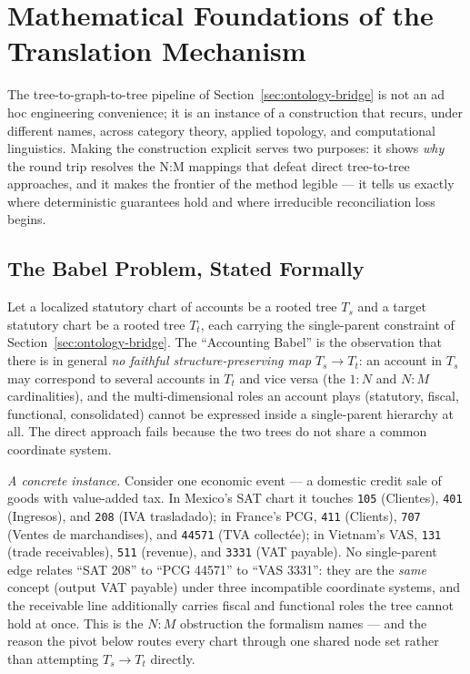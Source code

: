 \section{Mathematical Foundations of the Translation Mechanism}
\label{sec:mathfound}

The tree-to-graph-to-tree pipeline of Section~\ref{sec:ontology-bridge} is not an ad hoc
engineering convenience; it is an instance of a construction that recurs, under different
names, across category theory, applied topology, and computational linguistics. Making the
construction explicit serves two purposes: it shows \emph{why} the round trip resolves the
N:M mappings that defeat direct tree-to-tree approaches, and it makes the frontier of the
method legible --- it tells us exactly where deterministic guarantees hold and where
irreducible reconciliation loss begins.

\subsection{The Babel Problem, Stated Formally}
Let a localized statutory chart of accounts be a rooted tree $T_s$ and a target statutory
chart be a rooted tree $T_t$, each carrying the single-parent constraint of
Section~\ref{sec:ontology-bridge}. The ``Accounting Babel'' is the observation that there is
in general \emph{no faithful structure-preserving map} $T_s \rightarrow T_t$: an account in
$T_s$ may correspond to several accounts in $T_t$ and vice versa (the $1{:}N$ and $N{:}M$
cardinalities), and the multi-dimensional roles an account plays (statutory, fiscal,
functional, consolidated) cannot be expressed inside a single-parent hierarchy at all. The
direct approach fails because the two trees do not share a common coordinate system.

\emph{A concrete instance.} Consider one economic event --- a domestic credit
sale of goods with value-added tax. In Mexico's SAT chart it touches
\texttt{105} (Clientes), \texttt{401} (Ingresos), and \texttt{208}
(IVA trasladado); in France's PCG, \texttt{411} (Clients), \texttt{707}
(Ventes de marchandises), and \texttt{44571} (TVA collect\'ee); in Vietnam's
VAS, \texttt{131} (trade receivables), \texttt{511} (revenue), and
\texttt{3331} (VAT payable). No single-parent edge relates ``SAT 208'' to
``PCG 44571'' to ``VAS 3331'': they are the \emph{same} concept
(output VAT payable) under three incompatible coordinate systems, and the
receivable line additionally carries fiscal and functional roles the tree
cannot hold at once. This is the $N{:}M$ obstruction the formalism names ---
and the reason the pivot below routes every chart through one shared node set
rather than attempting $T_s \rightarrow T_t$ directly.


